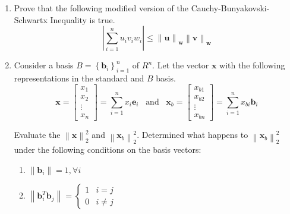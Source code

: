 \begin{enumerate}
    \item Prove that the following modified version of the Cauchy-Bunyakovski-Schwartx Inequality is true.
    \[ \left\lvert \sum_{i=1}^{n} u_iv_iw_i \right\rvert \leq \left\lVert \mathbf{u}\right\rVert_\mathbf{w} \left\lVert \mathbf{v}\right\rVert_\mathbf{w} \]

    \item Consider a basis $B = \left\{\mathbf{b}_i\right\}_{i=1}^{n}$ of $R^n$. Let the vector $\mathbf{x}$ with the following representations in the standard and $B$ basis.
    \[ \mathbf{x} = \begin{bmatrix*}x_1\\x_2\\\vdots\\x_n\end{bmatrix*} = \sum_{i=1}^{n}x_i\mathbf{e}_i \,\,\,\,\, \text{and} \,\,\,\,\, \mathbf{x}_b =  \begin{bmatrix*}x_{b1}\\x_{b2}\\\vdots\\x_{bn}\end{bmatrix*} = \sum_{i=1}^{n}x_{bi}\mathbf{b}_i \]

    Evaluate the $\left\lVert \mathbf{x}\right\rVert_2^2$ and $\left\lVert \mathbf{x}_b\right\rVert_2^2$. Determined what happens to $\left\lVert \mathbf{x}_b\right\rVert_2^2$ under the following conditions on the basis vectors:
    \begin{enumerate}
        \item $\left\lVert \mathbf{b}_i\right\rVert = 1, \forall i$
        \item $\left\lVert \mathbf{b}_i^T\mathbf{b}_j\right\rVert = \begin{cases}
        1 & i = j\\
        0 & i \neq j
        \end{cases}$
    \end{enumerate}


\end{enumerate}
